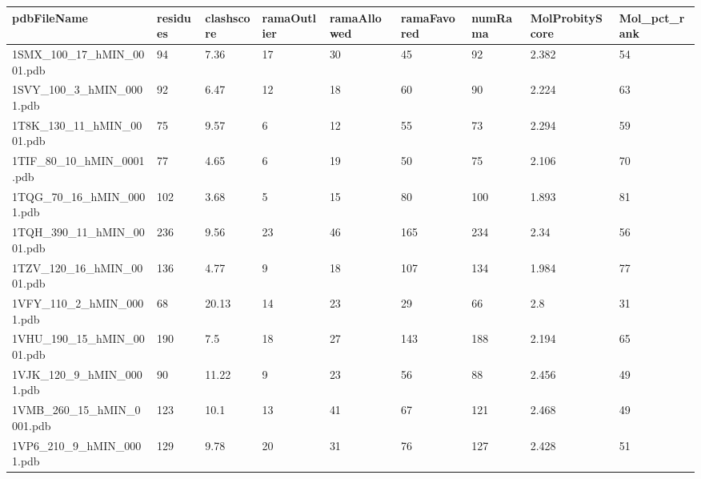 \documentclass{bioinfo}
\begin{document}
\begin{table}[!t]
{\begin{tabular}{lllllllll}\toprule
    pdbFileName             & residues & clashscore & ramaOutlier & ramaAllowed & ramaFavored & numRama & MolProbityScore & Mol\_pct\_rank \\ \midrule
    1SMX\_100\_17\_hMIN\_0001.pdb & 94       & 7.36       & 17          & 30          & 45          & 92      & 2.382           & 54           \\
    1SVY\_100\_3\_hMIN\_0001.pdb & 92       & 6.47       & 12          & 18          & 60          & 90      & 2.224           & 63           \\
    1T8K\_130\_11\_hMIN\_0001.pdb & 75       & 9.57       & 6           & 12          & 55          & 73      & 2.294           & 59           \\
    1TIF\_80\_10\_hMIN\_0001.pdb & 77       & 4.65       & 6           & 19          & 50          & 75      & 2.106           & 70           \\
    1TQG\_70\_16\_hMIN\_0001.pdb & 102      & 3.68       & 5           & 15          & 80          & 100     & 1.893           & 81           \\
    1TQH\_390\_11\_hMIN\_0001.pdb & 236      & 9.56       & 23          & 46          & 165         & 234     & 2.34            & 56           \\
    1TZV\_120\_16\_hMIN\_0001.pdb & 136      & 4.77       & 9           & 18          & 107         & 134     & 1.984           & 77           \\
    1VFY\_110\_2\_hMIN\_0001.pdb & 68       & 20.13      & 14          & 23          & 29          & 66      & 2.8             & 31           \\
    1VHU\_190\_15\_hMIN\_0001.pdb & 190      & 7.5        & 18          & 27          & 143         & 188     & 2.194           & 65           \\
    1VJK\_120\_9\_hMIN\_0001.pdb & 90       & 11.22      & 9           & 23          & 56          & 88      & 2.456           & 49           \\
    1VMB\_260\_15\_hMIN\_0001.pdb & 123      & 10.1       & 13          & 41          & 67          & 121     & 2.468           & 49           \\
    1VP6\_210\_9\_hMIN\_0001.pdb & 129      & 9.78       & 20          & 31          & 76          & 127     & 2.428           & 51           \\

\end{tabular}}
\end{table}
\end{document}
